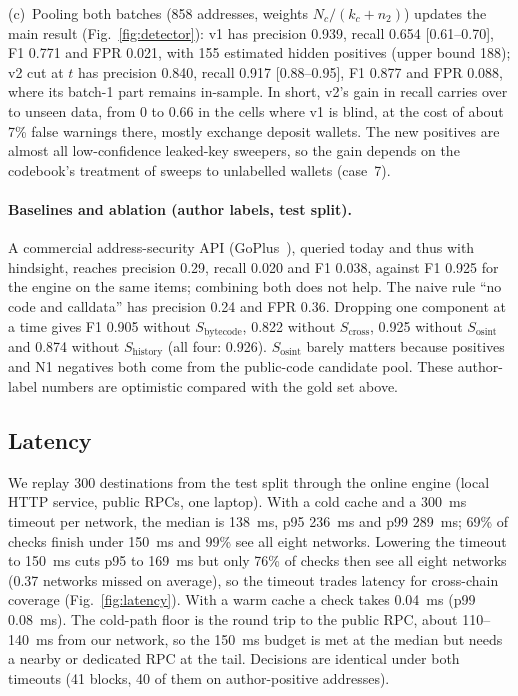 \documentclass[runningheads]{llncs}
\begin{document}
(c)~Pooling both batches (858 addresses, weights $N_c/(k_c+n_2)$) updates the
main result (Fig.~\ref{fig:detector}): v1 has precision 0.939, recall 0.654 [0.61--0.70], F1 0.771 and FPR
0.021, with 155 estimated hidden positives (upper bound 188); v2 cut at $t$ has
precision 0.840, recall 0.917 [0.88--0.95], F1 0.877 and FPR 0.088, where its
batch-1 part remains in-sample. In short, v2's gain in recall carries over to unseen
data, from 0 to 0.66 in the cells where v1 is blind, at the cost of about 7\%
false warnings there, mostly exchange deposit wallets. The new positives are
almost all low-confidence leaked-key sweepers, so the gain depends on the
codebook's treatment of sweeps to unlabelled wallets (case~7).

\paragraph{Baselines and ablation (author labels, test split).} A commercial
address-security API (GoPlus~\cite{goplus}), queried today and thus with hindsight, reaches
precision 0.29, recall 0.020 and F1 0.038, against F1 0.925 for the engine on the
same items; combining both does not help. The naive rule ``no code and calldata''
has precision 0.24 and FPR 0.36. Dropping one component at a time gives F1 0.905
without $S_{\mathrm{bytecode}}$, 0.822 without $S_{\mathrm{cross}}$, 0.925 without
$S_{\mathrm{osint}}$ and 0.874 without $S_{\mathrm{history}}$ (all four: 0.926).
$S_{\mathrm{osint}}$ barely matters because positives and N1 negatives both come
from the public-code candidate pool. These author-label numbers are optimistic
compared with the gold set above.

\subsection{Latency}
We replay 300 destinations from the test split through the online engine
(local HTTP service, public RPCs, one laptop). With a cold
cache and a 300~ms timeout per network, the median is 138~ms, p95 236~ms and p99
289~ms; 69\% of checks finish under 150~ms and 99\% see all eight networks.
Lowering the timeout to 150~ms cuts p95 to 169~ms but only 76\% of checks then
see all eight networks (0.37 networks missed on average), so the timeout trades
latency for cross-chain coverage (Fig.~\ref{fig:latency}). With a warm cache a check takes 0.04~ms (p99
0.08~ms). The cold-path floor is the round trip to the public RPC, about
110--140~ms from our network, so the 150~ms budget is met at the median but needs
a nearby or dedicated RPC at the tail. Decisions are identical under both
timeouts (41 blocks, 40 of them on author-positive addresses).
\end{document}
